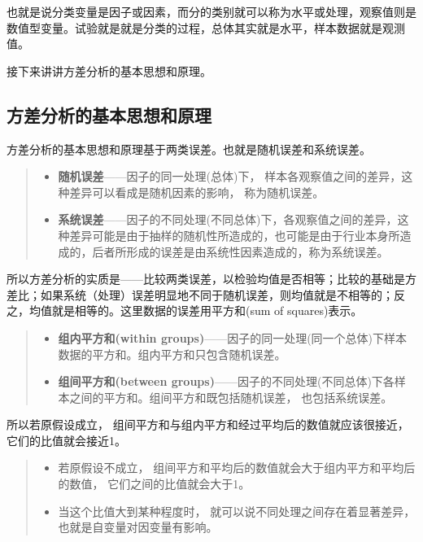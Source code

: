 \documentclass[]{ctexbook}
\providecommand{\tightlist}{%
  \setlength{\itemsep}{0pt}\setlength{\parskip}{0pt}}
\begin{document}
也就是说分类变量是因子或因素，而分的类别就可以称为水平或处理，观察值则是数值型变量。试验就是就是分类的过程，总体其实就是水平，样本数据就是观测值。

接下来讲讲方差分析的基本思想和原理。

\hypertarget{ux65b9ux5deeux5206ux6790ux7684ux57faux672cux601dux60f3ux548cux539fux7406}{%
\subsection{方差分析的基本思想和原理}\label{ux65b9ux5deeux5206ux6790ux7684ux57faux672cux601dux60f3ux548cux539fux7406}}

方差分析的基本思想和原理基于两类误差。也就是随机误差和系统误差。

\begin{quote}
\begin{itemize}
\tightlist
\item
  \textbf{随机误差}------因子的同一处理(总体)下， 样本各观察值之间的差异，这种差异可以看成是随机因素的影响， 称为随机误差。
\item
  \textbf{系统误差}------因子的不同处理(不同总体)下，各观察值之间的差异，这种差异可能是由于抽样的随机性所造成的，也可能是由于行业本身所造成的，后者所形成的误差是由系统性因素造成的，称为系统误差。
\end{itemize}
\end{quote}

所以方差分析的实质是------比较两类误差，以检验均值是否相等；比较的基础是方差比；如果系统（处理）误差明显地不同于随机误差，则均值就是不相等的；反之，均值就是相等的。这里数据的误差用平方和(sum of squares)表示。

\begin{quote}
\begin{itemize}
\tightlist
\item
  \textbf{组内平方和(within groups)}------因子的同一处理(同一个总体)下样本数据的平方和。组内平方和只包含随机误差。
\item
  \textbf{组间平方和(between groups)}------因子的不同处理(不同总体)下各样本之间的平方和。组间平方和既包括随机误差， 也包括系统误差。
\end{itemize}
\end{quote}

所以若原假设成立， 组间平方和与组内平方和经过平均后的数值就应该很接近， 它们的比值就会接近1。

\begin{quote}
\begin{itemize}
\tightlist
\item
  若原假设不成立， 组间平方和平均后的数值就会大于组内平方和平均后的数值， 它们之间的比值就会大于1。
\item
  当这个比值大到某种程度时， 就可以说不同处理之间存在着显著差异， 也就是自变量对因变量有影响。
\end{itemize}
\end{quote}
\end{document}
